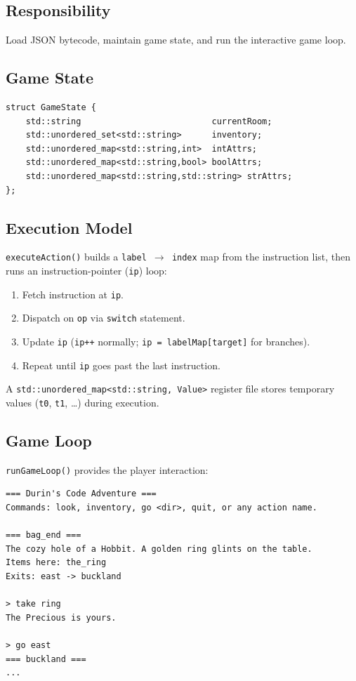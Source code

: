 \documentclass[12pt, a4paper]{article}
\begin{document}
\subsection{Responsibility}
Load JSON bytecode, maintain game state, and run the interactive game loop.

\subsection{Game State}

\begin{lstlisting}[style=cpp, caption={Runtime game state}]
struct GameState {
    std::string                          currentRoom;
    std::unordered_set<std::string>      inventory;
    std::unordered_map<std::string,int>  intAttrs;
    std::unordered_map<std::string,bool> boolAttrs;
    std::unordered_map<std::string,std::string> strAttrs;
};
\end{lstlisting}

\subsection{Execution Model}

\texttt{executeAction()} builds a \texttt{label $\rightarrow$ index} map from the
instruction list, then runs an instruction-pointer (\texttt{ip}) loop:

\begin{enumerate}
  \item Fetch instruction at \texttt{ip}.
  \item Dispatch on \texttt{op} via \texttt{switch} statement.
  \item Update \texttt{ip} (\texttt{ip++} normally; \texttt{ip = labelMap[target]}
        for branches).
  \item Repeat until \texttt{ip} goes past the last instruction.
\end{enumerate}

A \texttt{std::unordered\_map\textless std::string, Value\textgreater} register file
stores temporary values (\texttt{t0}, \texttt{t1}, \ldots) during execution.

\subsection{Game Loop}

\texttt{runGameLoop()} provides the player interaction:

\begin{lstlisting}[style=bash, caption={Sample game session}, numbers=none]
=== Durin's Code Adventure ===
Commands: look, inventory, go <dir>, quit, or any action name.

=== bag_end ===
The cozy hole of a Hobbit. A golden ring glints on the table.
Items here: the_ring
Exits: east -> buckland

> take ring
The Precious is yours.

> go east
=== buckland ===
...
\end{lstlisting}
\end{document}
